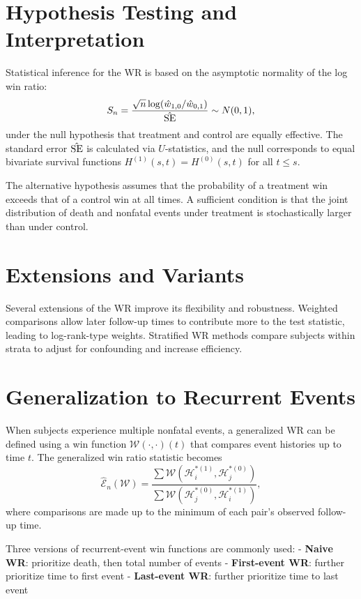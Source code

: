 \documentclass[
  letterpaper,
  DIV=11,
  numbers=noendperiod]{scrreprt}
\begin{document}
\section{Hypothesis Testing and
Interpretation}\label{hypothesis-testing-and-interpretation}

Statistical inference for the WR is based on the asymptotic normality of
the log win ratio: \[
S_n = \frac{\sqrt{n} \log(\hat w_{1,0} / \hat w_{0,1})}{\hat{\rm SE}} \sim N(0, 1),
\] under the null hypothesis that treatment and control are equally
effective. The standard error \(\hat{\rm SE}\) is calculated via
\(U\)-statistics, and the null corresponds to equal bivariate survival
functions \(H^{(1)}(s, t) = H^{(0)}(s, t)\) for all \(t \le s\).

The alternative hypothesis assumes that the probability of a treatment
win exceeds that of a control win at all times. A sufficient condition
is that the joint distribution of death and nonfatal events under
treatment is stochastically larger than under control.

\section{Extensions and Variants}\label{extensions-and-variants}

Several extensions of the WR improve its flexibility and robustness.
Weighted comparisons allow later follow-up times to contribute more to
the test statistic, leading to log-rank-type weights. Stratified WR
methods compare subjects within strata to adjust for confounding and
increase efficiency.

\section{Generalization to Recurrent
Events}\label{generalization-to-recurrent-events}

When subjects experience multiple nonfatal events, a generalized WR can
be defined using a win function \(\mathcal{W}(\cdot, \cdot)(t)\) that
compares event histories up to time \(t\). The generalized win ratio
statistic becomes \[
\hat{\mathcal E}_n(\mathcal W) = \frac{\sum \mathcal W(\mathcal H^{*(1)}_i, \mathcal H^{*(0)}_j)}
     {\sum \mathcal W(\mathcal H^{*(0)}_j, \mathcal H^{*(1)}_i)},
\] where comparisons are made up to the minimum of each pair's observed
follow-up time.

Three versions of recurrent-event win functions are commonly used: -
\textbf{Naive WR}: prioritize death, then total number of events -
\textbf{First-event WR}: further prioritize time to first event -
\textbf{Last-event WR}: further prioritize time to last event
\end{document}
